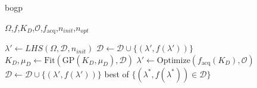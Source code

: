 \begin{algorithm}[h]
    \caption{\acrshort{bogp}}
    \label{algo:bo}
    \begin{algorithmic}[1]
    \Require 
        $\Omega$,$f$,$K_D$,$\mathcal{O}$,$f_{\text{acq}}$,$n_{init} $,$n_{opt}$
            
     
        \State $\lambda' \gets LHS(\Omega,\mathcal{D},n_{init})$ 
        \State $\mathcal{D} \gets \mathcal{D} \cup \{(\lambda', f(\lambda'))\}$ 
    \EndFor 
     
        \State $K_D,\mu_D \gets \text{Fit}(\text{GP}(K_D,\mu_D), \mathcal{D})$ 
        \State $\lambda' \gets \text{Optimize}(f_{\text{acq}}(K_D), \mathcal{O})$ 
        \State $\mathcal{D} \gets \mathcal{D} \cup \{(\lambda', f(\lambda'))\}$ 
    \EndFor
    \State \Return best of $\{(\lambda^*, f(\lambda^*)) \in \mathcal{D}\}$
    \end{algorithmic}
\end{algorithm}